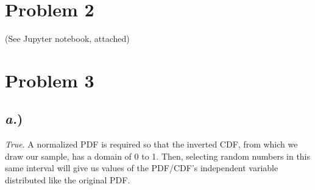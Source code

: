 \documentclass{article}
\begin{document}

\section*{Problem 2}

(See Jupyter notebook, attached)




\section*{Problem 3}

\subsection*{\textit{a.})} 
\textit{True}. A normalized PDF is required so that the inverted CDF, from which we draw our sample, has a domain of 0 to 1. Then, selecting random numbers in this same interval will give us values of the PDF/CDF's independent variable distributed like the original PDF.
\end{document}
